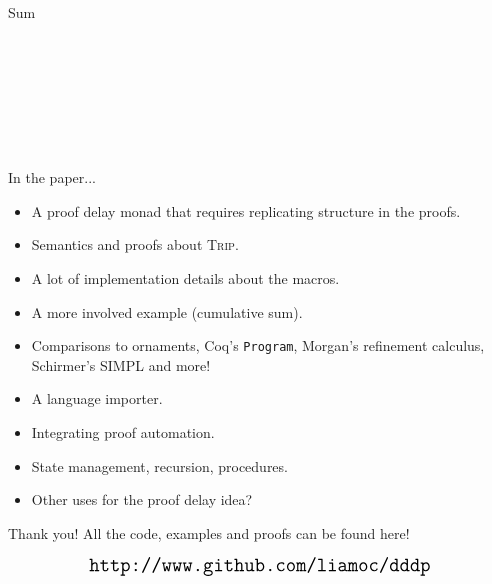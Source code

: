 \documentclass{beamer}
\begin{document}
\begin{frame}{Sum}
\begin{code}
\AgdaSymbol{)}\AgdaSpace{}%
\<%
\\
%
\>[11]\AgdaSpace{}%
\AgdaSpace{}%
\AgdaSymbol{(}\AgdaSpace{}%
\AgdaOperator{\AgdaPrimitive{+}}\AgdaSpace{}%
\AgdaSymbol{)}\<%
\\
%
\>[9]\AgdaSpace{}%
\<%
\\
%
\>[9]\AgdaSpace{}%
\AgdaSymbol{(}\AgdaSpace{}%
\AgdaSpace{}%
\AgdaOperator{\AgdaFunction{<}}\AgdaSpace{}%
\AgdaSpace{}%
\<%
\\
\>[11]$\quad$\AgdaSpace{}%
\AgdaSpace{}%
\AgdaSpace{}%
\AgdaSpace{}%
\AgdaSymbol{(}\AgdaSpace{}%
\AgdaSpace{}%
\AgdaSymbol{)}\AgdaSpace{}\<%
\\
\>[11]$\quad$\AgdaSpace{}%
\AgdaSpace{}%
\AgdaSpace{}%
\AgdaSpace{}%
\AgdaSpace{}%
\AgdaSymbol{)}\<%
\end{code}
    \end{frame}
    \begin{frame}{In the paper...}
        \begin{itemize}
            \item A proof delay \alert{monad} that requires replicating structure in the proofs.\pause
            \item Semantics and proofs about \textsc{Trip}.
            \item A lot of implementation details about the macros.\pause
            \item A more involved example (cumulative sum).\pause
            \item Comparisons to ornaments, Coq's \texttt{Program}, Morgan's refinement calculus, Schirmer's \textsc{SIMPL} and more!
        \end{itemize}\pause
        \begin{itemize}
            \item A language importer.
            \item Integrating proof automation.
            \item State management, recursion, procedures.
            \item Other uses for the proof delay idea?
        \end{itemize}
    \end{frame}
    \begin{frame}{Thank you!}
        All the code, examples and proofs can be found here!

        $$\text{\Large \texttt{http://www.github.com/liamoc/dddp}}$$
    \end{frame}
\end{document}
